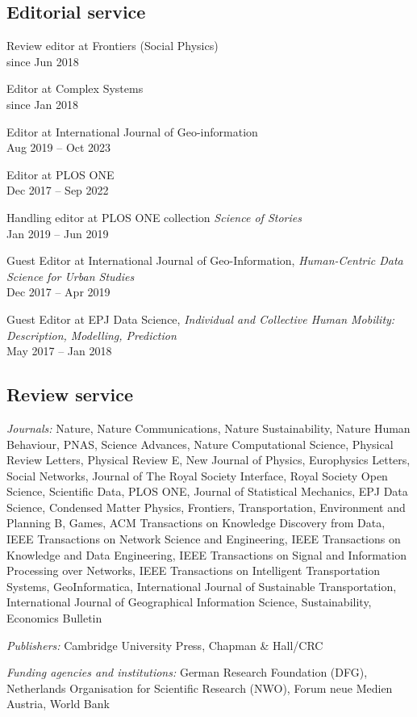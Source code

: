 \documentclass[10pt,a4paper]{article}
\renewenvironment{itemize}{
  \begin{list}{}{
    \setlength{\leftmargin}{1.5em}
    \setlength{\itemsep}{0.25em}
    \setlength{\parskip}{0pt}
    \setlength{\parsep}{0.25em}
  }
}{
  \end{list}
}
\begin{document}
\subsection*{Editorial service}
\begin{itemize}
\item Review editor at Frontiers (Social Physics)\\since Jun 2018
\item Editor at Complex Systems\\since Jan 2018
\item Editor at International Journal of Geo-information\\Aug 2019 -- Oct 2023
\item Editor at PLOS ONE\\Dec 2017 -- Sep 2022
\item Handling editor at PLOS ONE collection \emph{Science of Stories}\\Jan 2019 -- Jun 2019
\item Guest Editor at International Journal of Geo-Information, \emph{Human-Centric Data Science for Urban Studies}\\Dec 2017 -- Apr 2019
\item Guest Editor at EPJ Data Science, \emph{Individual and Collective Human Mobility: Description, Modelling, Prediction}\\May 2017 -- Jan 2018
\end{itemize}

\subsection*{Review service}
\begin{itemize}
\item{\emph{Journals:} Nature, Nature Communications, Nature Sustainability, Nature Human Behaviour, PNAS, Science Advances, Nature Computational Science, Physical Review Letters, Physical Review E, New Journal of Physics, Europhysics Letters, Social Networks, Journal of The Royal Society Interface, Royal Society Open Science, Scientific Data, PLOS ONE, Journal of Statistical Mechanics, EPJ Data Science, Condensed Matter Physics, Frontiers, Transportation, Environment and Planning B, Games, ACM Transactions on Knowledge Discovery from Data, IEEE Transactions on Network Science and Engineering, IEEE Transactions on Knowledge and Data Engineering, IEEE Transactions on Signal and Information Processing over Networks, IEEE Transactions on Intelligent Transportation Systems, GeoInformatica, International Journal of Sustainable Transportation, International Journal of Geographical Information Science, Sustainability, Economics Bulletin}
\item{\emph{Publishers:} Cambridge University Press, Chapman \& Hall/CRC}
\item{\emph{Funding agencies and institutions:} German Research Foundation (DFG), Netherlands Organisation for Scientific Research (NWO), Forum neue Medien Austria, World Bank}
\end{itemize}
\end{document}
